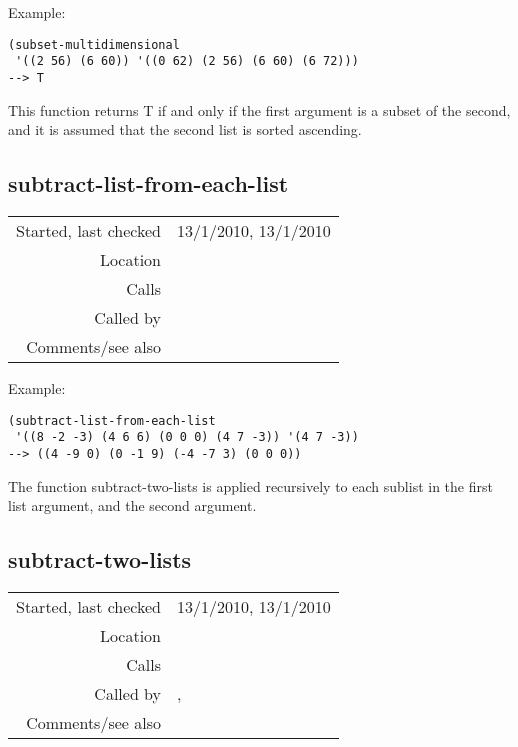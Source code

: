 \vspace{0.5cm}
\noindent Example:
\begin{verbatim}
(subset-multidimensional
 '((2 56) (6 60)) '((0 62) (2 56) (6 60) (6 72)))
--> T
\end{verbatim}

\noindent This function returns T if and only if the
first argument is a subset of the second, and it is
assumed that the second list is sorted ascending.


\subsection*{subtract-list-from-each-list}\label{fun:subtract-list-from-each-list}

\vspace{0.3cm}
\begin{tabular}{r|p{8cm}}
Started, last checked & 13/1/2010, 13/1/2010 \\
Location & \nameref{sec:set-operations} \\
Calls & \nameref{fun:subtract-two-lists} \\
Called by & \nameref{fun:translators-of-pattern-in-dataset} \\
Comments/see also & \nameref{fun:subtract-list-from-each-list-mod-2nd-n}
\end{tabular}

\vspace{0.5cm}
\noindent Example:
\begin{verbatim}
(subtract-list-from-each-list
 '((8 -2 -3) (4 6 6) (0 0 0) (4 7 -3)) '(4 7 -3))
--> ((4 -9 0) (0 -1 9) (-4 -7 3) (0 0 0))
\end{verbatim}

\noindent The function subtract-two-lists is applied
recursively to each sublist in the first list
argument, and the second argument.


\subsection*{subtract-two-lists}\label{fun:subtract-two-lists}

\vspace{0.3cm}
\begin{tabular}{r|p{8cm}}
Started, last checked & 13/1/2010, 13/1/2010 \\
Location & \nameref{sec:set-operations} \\
Calls & \\
Called by & \nameref{fun:subtract-list-from-each-list},\newline \nameref{fun:test-translation-no-length-check} \\
Comments/see also & \nameref{fun:subtract-two-lists-mod-2nd-n}
\end{tabular}

